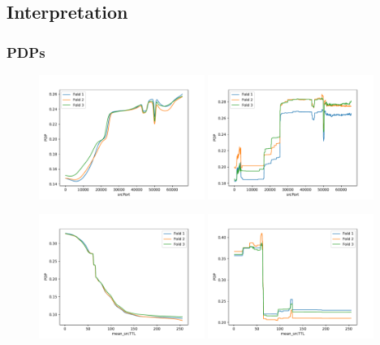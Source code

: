 \documentclass[10pt,sigconf,letterpaper,dvipsnames]{acmart}
\begin{document}
\subsection{Interpretation}
\subsubsection{PDPs}

\begin{figure}[h]
\includegraphics[width=0.48\textwidth]{../pdp_CAIA_backdoor_17/sourceTransportPort_nn.pdf}
\includegraphics[width=0.48\textwidth]{../pdp_CAIA_backdoor_17/sourceTransportPort_rf.pdf}

\includegraphics[width=0.48\textwidth]{../pdp_CAIA_backdoor_17/apply(mean(ipTTL),forward)_nn.pdf}
\includegraphics[width=0.48\textwidth]{../pdp_CAIA_backdoor_17/apply(mean(ipTTL),forward)_rf.pdf}


\end{figure}
\end{document}
